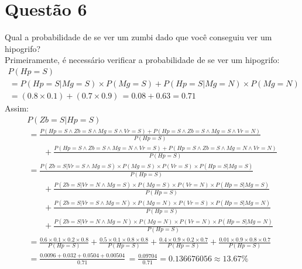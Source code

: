 \documentclass{article}
\begin{document}
    \section*{Questão 6}
        Qual a probabilidade de se ver um zumbi dado que você conseguiu
        ver um hipogrifo? \\
        Primeiramente, é necessário verificar a probabilidade de se ver
        um hipogrifo:
        \begin{gather*}
            P(Hp=S) \\
            \,= P(Hp=S|Mg=S) \times P(Mg=S) + P(Hp=S|Mg=N) \times P(Mg=N) \\
            \,= (0.8 \times 0.1) + (0.7 \times 0.9)
            \,= 0.08 + 0.63 = 0.71
        \end{gather*}
        Assim:
        \begin{gather*}
            P(Zb=S|Hp=S) \\
            \,= \frac{P(Hp=S \land Zb=S \land Mg=S \land Vr=S)
            + P(Hp=S \land Zb=S \land Mg=S \land Vr=N)}{P(Hp=S)} \\
            \qquad+ \frac{P(Hp=S \land Zb=S \land Mg=N \land Vr=S)
            + P(Hp=S \land Zb=S \land Mg=N \land Vr=N)}{P(Hp=S)} \\
            \,= \frac{P(Zb=S|Vr=S \land Mg=S) \times P(Mg=S) \times P(Vr=S)
                \times P(Hp=S|Mg=S)}{P(Hp=S)} \\
            \qquad+ \frac{P(Zb=S|Vr=N \land Mg=S) \times P(Mg=S) \times P(Vr=N)
                \times P(Hp=S|Mg=S)}{P(Hp=S)} \\
            \qquad+ \frac{P(Zb=S|Vr=S \land Mg=N) \times P(Mg=N) \times P(Vr=S)
                \times P(Hp=S|Mg=N)}{P(Hp=S)} \\
            \qquad+ \frac{P(Zb=S|Vr=N \land Mg=N) \times P(Mg=N) \times P(Vr=N)
                \times P(Hp=S|Mg=N)}{P(Hp=S)} \\
            \,= \frac{0.6 \times 0.1 \times 0.2 \times 0.8}{P(Hp=S)}
            + \frac{0.5 \times 0.1 \times 0.8 \times 0.8}{P(Hp=S)}
            + \frac{0.4 \times 0.9 \times 0.2 \times 0.7}{P(Hp=S)}
            + \frac{0.01 \times 0.9 \times 0.8 \times 0.7}{P(Hp=S)} \\
            \,= \frac{0.0096 + 0.032 + 0.0504 + 0.00504}{0.71}
            \,= \frac{0.09704}{0.71} = 0.136676056 \approx 13.67\%
        \end{gather*}
\end{document}
